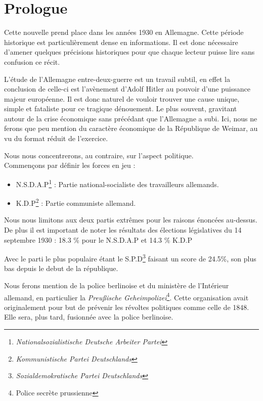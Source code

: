 \part*{Prologue}

\raggedright

Cette nouvelle prend place dans les années 1930 en Allemagne.
Cette période historique est particulièrement dense en informations.
Il est donc nécessaire d'amener quelques précisions historiques pour que chaque lecteur puisse lire sans confusion ce récit.

L'étude de l'Allemagne entre-deux-guerre est un travail subtil, 
en effet la conclusion de celle-ci est l'avènement d'Adolf Hitler au pouvoir d'une puissance majeur européenne.
Il est donc naturel de vouloir trouver une cause unique, simple et fataliste pour ce tragique dénouement.
Le plus souvent, gravitant autour de la crise économique sans précédant que l'Allemagne a subi. 
Ici, nous ne ferons que peu mention du caractère économique de la République de Weimar, au vu du format réduit de l'exercice.

Nous nous concentrerons, au contraire, sur l'aspect politique.\\
Commençons par définir les forces en jeu :

\begin{itemize}
    \item N.S.D.A.P\footnote{\textit{Nationalsozialistische Deutsche Arbeiter Partei}} : Partie national-socialiste des travailleurs allemands.
    \item K.D.P\footnote{\textit{Kommunistische Partei Deutschlands}} : Partie communiste allemand.
\end{itemize}

Nous nous limitons aux deux partis extrêmes pour les raisons énoncées au-dessus.\\
De plus il est important de noter les résultats des élections législatives du 14 septembre 1930 :
18.3 \% pour le N.S.D.A.P et 14.3 \% K.D.P

Avec le parti le plus populaire étant le S.P.D\footnote{\textit{Sozialdemokratische Partei Deutschlands}} faisant un score de 24.5\%, son plus bas depuis le debut de la république.

Nous ferons mention de la police berlinoise et du ministère de l'Intérieur allemand, 
en particulier la \textit{Preußische Geheimpolizei}\footnote{Police secrète prussienne}.
Cette organisation avait originalement pour but de prévenir les révoltes politiques comme celle de 1848.
Elle sera, plus tard, fusionnée avec la police berlinoise.\\ 

